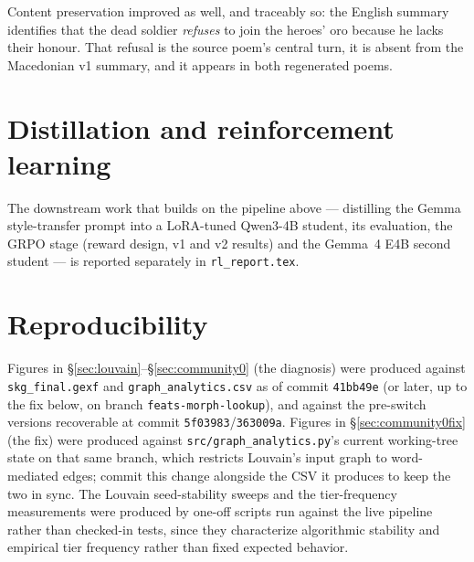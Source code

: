 \documentclass[11pt]{article}
\begin{document}
Content preservation improved as well, and traceably so: the English summary
identifies that the dead soldier \emph{refuses} to join the heroes' oro because
he lacks their honour. That refusal is the source poem's central turn, it is
absent from the Macedonian v1 summary, and it appears in both regenerated
poems.

\section{Distillation and reinforcement learning}

The downstream work that builds on the pipeline above --- distilling the
Gemma style-transfer prompt into a LoRA-tuned Qwen3-4B student, its
evaluation, the GRPO stage (reward design, v1 and v2 results) and the
Gemma~4 E4B second student --- is reported separately in
\texttt{rl\_report.tex}.

\section{Reproducibility}

Figures in \S\ref{sec:louvain}--\S\ref{sec:community0} (the diagnosis) were
produced against \texttt{skg\_final.gexf} and \texttt{graph\_analytics.csv}
as of commit \texttt{41bb49e} (or later, up to the fix below, on branch
\texttt{feats-morph-lookup}), and against the pre-switch versions recoverable
at commit \texttt{5f03983}/\texttt{363009a}. Figures in
\S\ref{sec:community0fix} (the fix) were produced against
\texttt{src/graph\_analytics.py}'s current working-tree state on that same
branch, which restricts Louvain's input graph to word-mediated edges; commit
this change alongside the CSV it produces to keep the two in sync. The
Louvain seed-stability sweeps and the tier-frequency measurements were
produced by one-off scripts run against the live pipeline rather than
checked-in tests, since they characterize algorithmic stability and
empirical tier frequency rather than fixed expected behavior.
\end{document}
